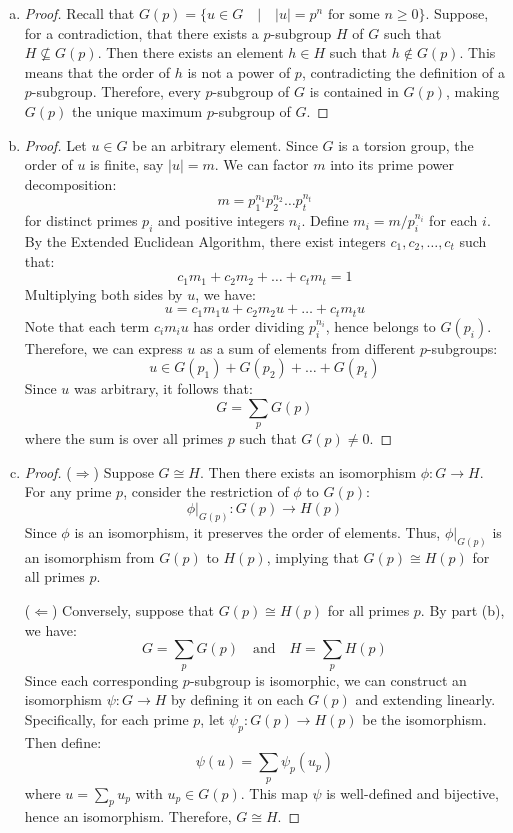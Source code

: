 \documentclass{article}
\begin{document}
\begin{enumerate}[(a)]
    \item \begin{proof}
        Recall that $G(p) = \{ u \in G \quad |\quad |u| = p^n \text{ for some } n \geq 0 \}$. Suppose, for a contradiction, that there exists a $p$-subgroup $H$ of $G$ such that $H \not\subseteq G(p)$. Then there exists an element $h \in H$ such that $h \notin G(p)$. This means that the order of $h$ is not a power of $p$, contradicting the definition of a $p$-subgroup. Therefore, every $p$-subgroup of $G$ is contained in $G(p)$, making $G(p)$ the unique maximum $p$-subgroup of $G$.
    \end{proof}
    \item \begin{proof}
        Let $u \in G$ be an arbitrary element. Since $G$ is a torsion group, the order of $u$ is finite, say $|u| = m$. We can factor $m$ into its prime power decomposition:
        \[
            m = p_1^{n_1} p_2^{n_2} \dots p_t^{n_t}
        \]
        for distinct primes $p_i$ and positive integers $n_i$. Define $m_i = m/p_i^{n_i}$ for each $i$. By the Extended Euclidean Algorithm, there exist integers $c_1, c_2, \dots, c_t$ such that:
        \[
            c_1 m_1 + c_2 m_2 + \dots + c_t m_t = 1
        \]
        Multiplying both sides by $u$, we have:
        \[
            u = c_1 m_1 u + c_2 m_2 u + \dots + c_t m_t u
        \]
        Note that each term $c_i m_i u$ has order dividing $p_i^{n_i}$, hence belongs to $G(p_i)$. Therefore, we can express $u$ as a sum of elements from different $p$-subgroups:
        \[
            u \in G(p_1) + G(p_2) + \dots + G(p_t)
        \]
        Since $u$ was arbitrary, it follows that:
        \[
            G = \sum_{p} G(p)
        \]
        where the sum is over all primes $p$ such that $G(p) \neq 0$.
    \end{proof}
    \newpage
    \item \begin{proof}
        ($\Rightarrow$) Suppose $G \cong H$. Then there exists an isomorphism $\phi: G \to H$. For any prime $p$, consider the restriction of $\phi$ to $G(p)$:
        \[
            \phi|_{G(p)}: G(p) \to H(p)
        \]
        Since $\phi$ is an isomorphism, it preserves the order of elements. Thus, $\phi|_{G(p)}$ is an isomorphism from $G(p)$ to $H(p)$, implying that $G(p) \cong H(p)$ for all primes $p$.

        ($\Leftarrow$) Conversely, suppose that $G(p) \cong H(p)$ for all primes $p$. By part (b), we have:
        \[
            G = \sum_{p} G(p) \quad \text{and} \quad H = \sum_{p} H(p)
        \]
        Since each corresponding $p$-subgroup is isomorphic, we can construct an isomorphism $\psi: G \to H$ by defining it on each $G(p)$ and extending linearly. Specifically, for each prime $p$, let $\psi_p: G(p) \to H(p)$ be the isomorphism. Then define:
        \[
            \psi(u) = \sum_{p} \psi_p(u_p)
        \]
        where $u = \sum_{p} u_p$ with $u_p \in G(p)$. This map $\psi$ is well-defined and bijective, hence an isomorphism. Therefore, $G \cong H$.
    \end{proof}
\end{enumerate}
\end{document}
